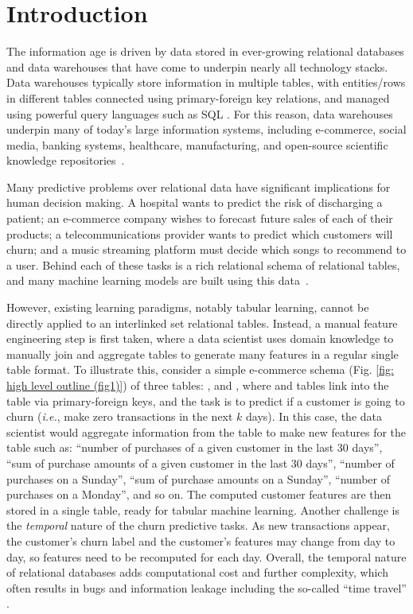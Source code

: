\section{Introduction}

The information age is driven by data stored in ever-growing relational databases and data warehouses 
that have come to underpin nearly all technology stacks. Data warehouses typically store information in multiple tables, with entities/rows in different tables connected using primary-foreign key relations, and managed using powerful query languages such as SQL \citep{codd1970relational,chamberlin1974sequel}. For this reason, data warehouses underpin many of today's large information systems, including e-commerce, social media, banking systems, healthcare, manufacturing, and open-source scientific knowledge repositories~\citep{johnson2016mimic,pubmed}.


Many predictive problems over relational data have significant implications for human decision making. A hospital wants to predict the risk of discharging a patient; an e-commerce company wishes to forecast future sales of each of their products; a telecommunications provider wants to predict which customers will churn; and a music streaming platform must decide which songs to recommend to a user. Behind each of these tasks is a rich relational schema of relational tables, and many machine learning models are built using this data~\citep{kaggle-survey}. 

However, existing learning paradigms, notably tabular learning, cannot be directly applied to an interlinked set relational tables.
Instead, a manual feature engineering step is first taken, where a data scientist uses domain knowledge to manually join and aggregate tables to generate many features in a regular single table format. 
To illustrate this, consider a simple e-commerce schema (Fig. \ref{fig: high level outline (fig1)}) of three tables: ,  and , where  and  tables link into the  table via primary-foreign keys, and the task is to predict if a customer is going to churn (\emph{i.e.}, make zero transactions in the next $k$ days). In this case, the data scientist would aggregate information from the  table to make new features for the  table such as: ``number of purchases of a given customer in the last 30 days'', ``sum of purchase amounts of a given customer in the last 30 days'', ``number of purchases on a Sunday'', ``sum of purchase amounts on a Sunday'', ``number of purchases on a Monday'', and so on. The computed customer features are then stored in a single table, ready for tabular machine learning. Another challenge is the {\em temporal} nature of the churn predictive tasks. As new transactions appear, the customer's churn label and the customer's features may change from day to day, so features need to be recomputed for each day. Overall, the temporal nature of relational databases adds computational cost and further complexity, which often results in bugs and information leakage including the so-called ``time travel'' \citep{kapoor2023leakage}.


